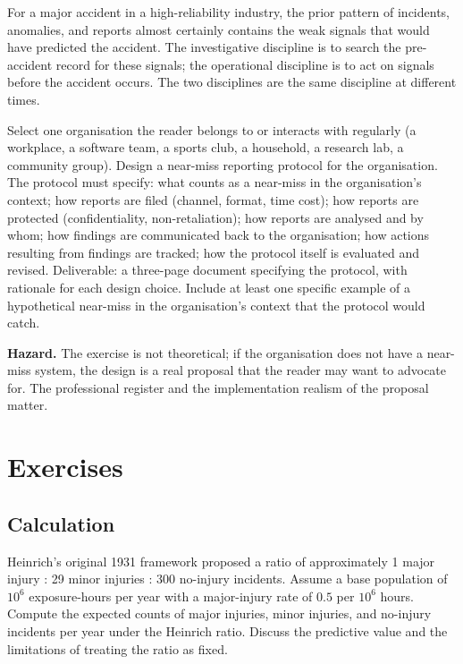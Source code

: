 \begin{principle}
For a major accident in a high-reliability industry, the prior pattern of incidents, anomalies, and reports almost certainly contains the weak signals that would have predicted the accident. The investigative discipline is to search the pre-accident record for these signals; the operational discipline is to act on signals before the accident occurs. The two disciplines are the same discipline at different times.
\end{principle}

\begin{project}
Select one organisation the reader belongs to or interacts with regularly (a workplace, a software team, a sports club, a household, a research lab, a community group). Design a near-miss reporting protocol for the organisation. The protocol must specify: what counts as a near-miss in the organisation's context; how reports are filed (channel, format, time cost); how reports are protected (confidentiality, non-retaliation); how reports are analysed and by whom; how findings are communicated back to the organisation; how actions resulting from findings are tracked; how the protocol itself is evaluated and revised. Deliverable: a three-page document specifying the protocol, with rationale for each design choice. Include at least one specific example of a hypothetical near-miss in the organisation's context that the protocol would catch.

\textbf{Hazard.} The exercise is not theoretical; if the organisation does not have a near-miss system, the design is a real proposal that the reader may want to advocate for. The professional register and the implementation realism of the proposal matter.
\end{project}

\section{Exercises}

\subsection*{Calculation}

\begin{exercise}
Heinrich's original 1931 framework proposed a ratio of approximately 1 major injury : 29 minor injuries : 300 no-injury incidents. Assume a base population of $10^6$ exposure-hours per year with a major-injury rate of $0.5$ per $10^6$ hours. Compute the expected counts of major injuries, minor injuries, and no-injury incidents per year under the Heinrich ratio. Discuss the predictive value and the limitations of treating the ratio as fixed.
\end{exercise}


